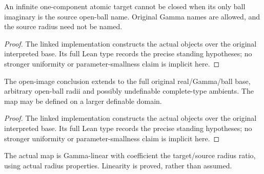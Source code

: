 \begin{lemma}

\label{s3-14}


\leanok

An infinite one-component atomic target cannot be closed when its only ball imaginary is the source open-ball name. Original Gamma names are allowed, and the source radius need not be named.

\end{lemma}

\begin{proof}


\leanok

The linked implementation constructs the actual objects over the original interpreted base. Its full Lean type records the precise standing hypotheses; no stronger uniformity or parameter-smallness claim is implicit here.

\end{proof}

\begin{lemma}

\label{s3-15}


\leanok

The open-image conclusion extends to the full original real/Gamma/ball base, arbitrary open-ball radii and possibly undefinable complete-type ambients. The map may be defined on a larger definable domain.

\end{lemma}

\begin{proof}


\leanok

The linked implementation constructs the actual objects over the original interpreted base. Its full Lean type records the precise standing hypotheses; no stronger uniformity or parameter-smallness claim is implicit here.

\end{proof}

\begin{lemma}

\label{s3-16}


\leanok

The actual map is Gamma-linear with coefficient the target/source radius ratio, using actual radius properties. Linearity is proved, rather than assumed.

\end{lemma}

